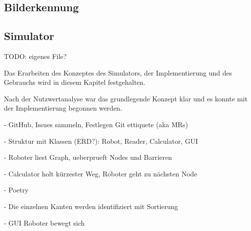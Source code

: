\subsection{Bilderkennung}

\subsection{Simulator}

TODO: eigenes File?

Das Erarbeiten des Konzeptes des Simulators, der Implementierung und des Gebrauchs wird in diesem Kapitel festgehalten.

Nach der Nutzwertanalyse war das grundlegende Konzept klar und es konnte mit der Implementierung begonnen werden.

- GitHub, Issues sammeln, Festlegen Git ettiquete (aka MRs)

- Struktur mit Klassen (ERD?): Robot, Reader, Calculator, GUI

- Roboter liest Graph, ueberprueft Nodes und Barrieren

- Calculator holt kürzester Weg, Roboter geht zu nächsten Node

- Poetry

- Die einzelnen Kanten werden identifiziert mit Sortierung

- GUI Roboter bewegt sich
